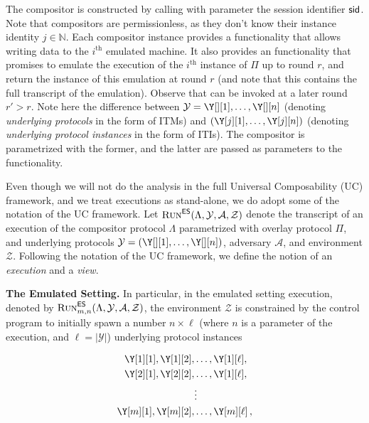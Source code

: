 The compositor is constructed by calling \emph{\construct} with parameter the session identifier $\textsf{sid}$.
Note that compositors are permissionless, as they don't know their instance identity $j \in \mathbb{N}$.
Each compositor instance provides a \emph{\writeToMachine}
functionality that allows writing data to the $i^\text{th}$ emulated machine.
It also provides an \emph{\emulateMachine} functionality that promises to emulate the execution of
the $i^\text{th}$ instance of $\Pi$ up to round $r$, and return the instance of this emulation
at round $r$ (and note that this contains the full transcript of the emulation).
Observe that \emph{\emulateMachine} can be invoked at a later round $r' > r$.
Note here the difference between $\mathcal{Y} = \Y[][1], \ldots, \Y[][n]$ (denoting \emph{underlying protocols}
in the form of ITMs) and
$(\Y[j][1], \ldots, \Y[j][n])$ (denoting \emph{underlying protocol instances}
in the form of ITIs). The compositor is parametrized with the former, and
the latter are passed as parameters to the \emph{\construct} functionality.

Even though we will not do the analysis in the full Universal Composability (UC) framework, and
we treat executions as stand-alone, we do adopt some of the notation of the UC framework.
Let $\textsc{Run}^{\textsf{ES}}(\Lambda, \mathcal{Y}, \mathcal{A}, \mathcal{Z})$
denote the transcript of an execution of the compositor protocol $\Lambda$ parametrized with overlay protocol $\Pi$,
and underlying protocols $\mathcal{Y} = (\Y[][1], \ldots, \Y[][n])$, adversary $\mathcal{A}$, and environment $\mathcal{Z}$.
Following the notation of the UC framework, we define the notion of an \emph{execution}
and a \emph{view}.

\noindent
\textbf{The Emulated Setting.}
In particular, in the emulated setting execution, denoted by $\textsc{Run}^{\textsf{ES}}_{m,n}(\Lambda, \mathcal{Y}, \mathcal{A}, \mathcal{Z})$,
the environment $\mathcal{Z}$ is constrained by the control program
to initially
spawn a number $n \times \ell$ (where $n$ is a parameter of the execution,
and $\ell = |\mathcal{Y}|$)
underlying protocol instances

\begin{align*}
\Y[1][1], \Y[1][2], &\ldots, \Y[1][\ell],\\
\Y[2][1], \Y[2][2], &\ldots, \Y[1][\ell],\\
                    &\vdots              \\
\Y[m][1], \Y[m][2], &\ldots, \Y[m][\ell]\,,
\end{align*}

